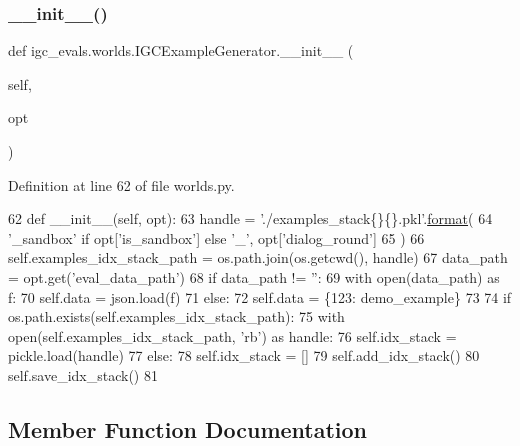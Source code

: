 \subsubsection{\texorpdfstring{\+\_\+\+\_\+init\+\_\+\+\_\+()}{\_\_init\_\_()}}
{\footnotesize\ttfamily def igc\+\_\+evals.\+worlds.\+I\+G\+C\+Example\+Generator.\+\_\+\+\_\+init\+\_\+\+\_\+ (\begin{DoxyParamCaption}\item[{}]{self,  }\item[{}]{opt }\end{DoxyParamCaption})}



Definition at line 62 of file worlds.\+py.


\begin{DoxyCode}
62     \textcolor{keyword}{def }\_\_init\_\_(self, opt):
63         handle = \textcolor{stringliteral}{'./examples\_stack\{\}\{\}.pkl'}.\hyperlink{namespaceparlai_1_1chat__service_1_1services_1_1messenger_1_1shared__utils_a32e2e2022b824fbaf80c747160b52a76}{format}(
64             \textcolor{stringliteral}{'\_sandbox'} \textcolor{keywordflow}{if} opt[\textcolor{stringliteral}{'is\_sandbox'}] \textcolor{keywordflow}{else} \textcolor{stringliteral}{'\_'}, opt[\textcolor{stringliteral}{'dialog\_round'}]
65         )
66         self.examples\_idx\_stack\_path = os.path.join(os.getcwd(), handle)
67         data\_path = opt.get(\textcolor{stringliteral}{'eval\_data\_path'})
68         \textcolor{keywordflow}{if} data\_path != \textcolor{stringliteral}{''}:
69             with open(data\_path) \textcolor{keyword}{as} f:
70                 self.data = json.load(f)
71         \textcolor{keywordflow}{else}:
72             self.data = \{123: demo\_example\}
73 
74         \textcolor{keywordflow}{if} os.path.exists(self.examples\_idx\_stack\_path):
75             with open(self.examples\_idx\_stack\_path, \textcolor{stringliteral}{'rb'}) \textcolor{keyword}{as} handle:
76                 self.idx\_stack = pickle.load(handle)
77         \textcolor{keywordflow}{else}:
78             self.idx\_stack = []
79             self.add\_idx\_stack()
80             self.save\_idx\_stack()
81 
\end{DoxyCode}


\subsection{Member Function Documentation}
\mbox{\label{classigc__evals_1_1worlds_1_1IGCExampleGenerator_aa0801aa3a53c7fd57a759c2080936174}} 
